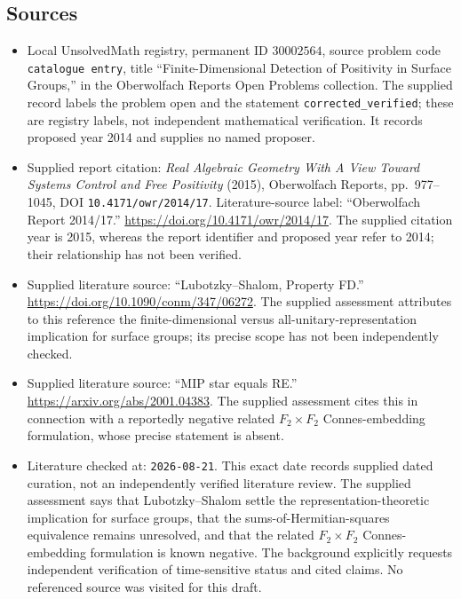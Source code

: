 \documentclass[11pt]{article}
\begin{document}
\subsection{Sources}
\begin{itemize}
\item Local UnsolvedMath registry, permanent ID \(30002564\), source problem code \texttt{catalogue entry}, title ``Finite-Dimensional Detection of Positivity in Surface Groups,'' in the Oberwolfach Reports Open Problems collection. The supplied record labels the problem open and the statement \texttt{corrected\_verified}; these are registry labels, not independent mathematical verification. It records proposed year 2014 and supplies no named proposer.
\item Supplied report citation: \emph{Real Algebraic Geometry With A View Toward Systems Control and Free Positivity} (2015), Oberwolfach Reports, pp.~977--1045, DOI \texttt{10.4171/owr/2014/17}. Literature-source label: ``Oberwolfach Report 2014/17.'' \url{https://doi.org/10.4171/owr/2014/17}. The supplied citation year is 2015, whereas the report identifier and proposed year refer to 2014; their relationship has not been verified.
\item Supplied literature source: ``Lubotzky--Shalom, Property FD.'' \url{https://doi.org/10.1090/conm/347/06272}. The supplied assessment attributes to this reference the finite-dimensional versus all-unitary-representation implication for surface groups; its precise scope has not been independently checked.
\item Supplied literature source: ``MIP star equals RE.'' \url{https://arxiv.org/abs/2001.04383}. The supplied assessment cites this in connection with a reportedly negative related \(F_2\times F_2\) Connes-embedding formulation, whose precise statement is absent.
\item Literature checked at: \texttt{2026-08-21}. This exact date records supplied dated curation, not an independently verified literature review. The supplied assessment says that Lubotzky--Shalom settle the representation-theoretic implication for surface groups, that the sums-of-Hermitian-squares equivalence remains unresolved, and that the related \(F_2\times F_2\) Connes-embedding formulation is known negative. The background explicitly requests independent verification of time-sensitive status and cited claims. No referenced source was visited for this draft.
\end{itemize}
\end{document}

